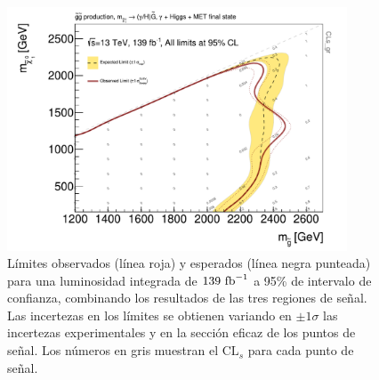 \begin{figure}[!ht]
  \centering


  \includegraphics[width=0.9\textwidth]{images/results/limits_plots/contour_plot_gHBestSR_wMatplotLib_full.pdf}

  \caption{Límites observados (línea roja) y esperados (línea negra punteada) para una luminosidad integrada de $139\ \text{fb}^{-1}$ a 95\% de intervalo de confianza, combinando los resultados de las tres regiones de señal. Las incertezas en los límites se obtienen variando en $\pm1\sigma$ las incertezas experimentales y en la sección eficaz de los puntos de señal. Los números en gris muestran el $\text{CL}_{s}$ para cada punto de señal.}
  \label{fig:limit_plot_combined}

\end{figure}

